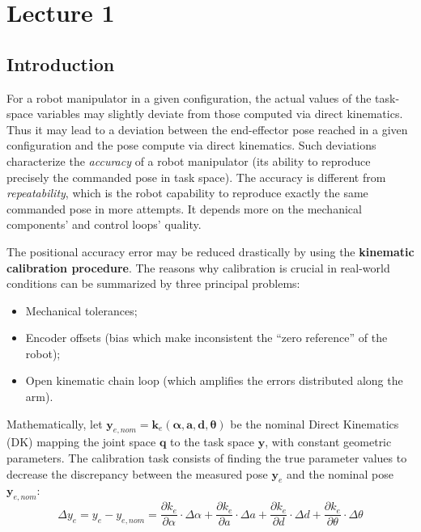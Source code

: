 
\section[Lecture 1 -- {\it Kinematic Calibration}]{Lecture 1}

\subsection{Introduction}

For a robot manipulator in a given configuration, the actual values of the task-space variables may slightly
deviate from those computed via direct kinematics. Thus it may lead to a deviation between the end-effector pose
reached in a given configuration and the pose compute via direct kinematics. Such deviations characterize the
\textit{accuracy} of a robot manipulator (its ability to reproduce precisely the commanded pose in task space).
The accuracy is different from \textit{repeatability}, which is the robot capability to reproduce exactly the 
same commanded pose in more attempts. It depends more on the mechanical components' and control loops' quality.

The positional accuracy error may be reduced drastically by using the \textbf{kinematic calibration procedure}.
The reasons why calibration is crucial in real-world conditions can be summarized by three principal problems:

\begin{itemize}[noitemsep]
  \item Mechanical tolerances;
  \item Encoder offsets (bias which make inconsistent the ``zero reference'' of the robot);
  \item Open kinematic chain loop (which amplifies the errors distributed along the arm).
\end{itemize}

Mathematically, let $\mathbf{y}_{e, nom} = \mathbf{k}_{e}(\boldsymbol{\alpha}, \mathbf{a}, \mathbf{d}, \boldsymbol{\theta})$
be the nominal Direct Kinematics (DK) mapping the joint space $\mathbf{q}$ to the task space $\mathbf{y}$, with constant geometric parameters. The calibration task consists of finding the true parameter values to decrease the discrepancy between the measured pose $\mathbf{y}_{e}$ and the nominal pose $\mathbf{y}_{e, nom}$:
$$
\Delta y_e = y_e - y_{e,nom} = \frac{\partial k_e}{\partial \alpha} \cdot \Delta \alpha + \frac{\partial k_e}{\partial a} \cdot \Delta a + \frac{\partial k_e}{\partial d} \cdot \Delta d + \frac{\partial k_e}{\partial \theta} \cdot \Delta \theta
$$

